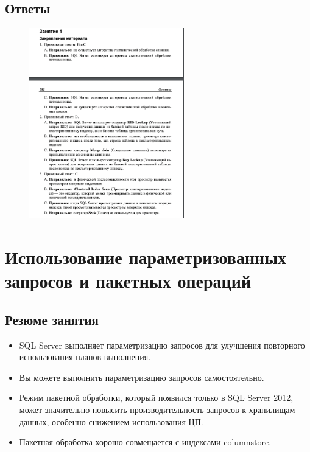 \subsection*{Ответы}

\begin{figure}[h!]
	\begin{center}
		\includegraphics[width=0.6\textwidth]{img/eans48.png}
	\end{center}
	\captionsetup{justification=centering}
\end{figure}
\clearpage



\section{Использование параметризованных запросов и пакетных операций}

\subsection*{Резюме занятия}
\begin{itemize}
	\item SQL Server выполняет параметризацию запросов для улучшения повторного использования планов выполнения. 
	\item Вы можете выполнить параметризацию запросов самостоятельно. 
	\item Режим пакетной обработки, который появился только в SQL Server 2012, может
	значительно повысить производительность запросов к хранилищам данных,
	особенно снижением использования ЦП. 
	\item Пакетная обработка хорошо совмещается с индексами columnstore. 
\end{itemize}



